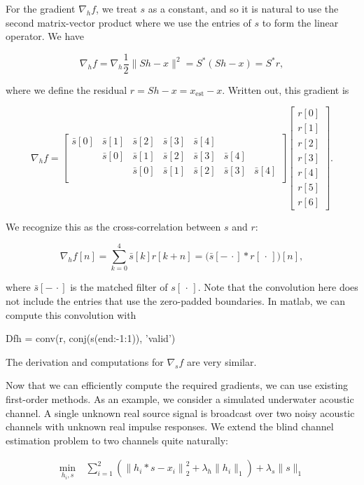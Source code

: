 \documentclass[journal]{IEEEtran}
\begin{document}
For the gradient $\nabla_hf$, we treat $s$ as a constant, and so it is natural to use the second matrix-vector product where we use the entries of $s$ to form the linear operator.  We have

\[ \nabla_hf = \nabla_h\frac{1}{2}\|Sh-x\|^2 = S^\ast(Sh-x) = S^\ast r, \] 

\noindent where we define the residual $r=Sh-x = x_\text{est}-x$.  Written out, this gradient is

\[ \nabla_h f = \begin{bmatrix} \bar{s}[0]&\bar{s}[1]&\bar{s}[2]&\bar{s}[3]&\bar{s}[4]\\&\bar{s}[0]&\bar{s}[1]&\bar{s}[2]&\bar{s}[3]&\bar{s}[4]\\&&\bar{s}[0]&\bar{s}[1]&\bar{s}[2]&\bar{s}[3]&\bar{s}[4]\\\end{bmatrix}\begin{bmatrix}r[0]\\r[1]\\r[2]\\r[3]\\r[4]\\r[5]\\r[6]\end{bmatrix}. \] 

\noindent We recognize this as the cross-correlation between $s$ and $r$:

\[ \nabla_h f[n] = \sum_{k=0}^4 \bar{s}[k]r[k+n] = \big(\bar{s}[{-\,\cdot}]\ast r[\,\cdot\,]\big)[n], \]

\noindent where $\bar{s}[{-\,\cdot}]$ is the matched filter of $s[\,\cdot\,]$.  Note that the convolution here does not include the entries that use the zero-padded boundaries.  In {\sc matlab}, we can compute this convolution with

\begin{verb}
  Dfh = conv(r, conj(s(end:-1:1)), 'valid')
\end{verb}

\noindent The derivation and computations for $\nabla_sf$ are very similar.

Now that we can efficiently compute the required gradients, we can use existing first-order methods.  As an example, we consider a simulated underwater acoustic channel.  A single unknown real source signal is broadcast over two noisy acoustic channels with unknown real impulse responses.  We extend the blind channel estimation problem to two channels quite naturally:

\begin{align*}
   \min_{h_i,s} ~&\sum_{i=1}^2\left(\left\|h_i\ast s - x_i\right\|_2^2 + \lambda_{h}\|h_i\|_1\right) + \lambda_s\|s\|_1
\end{align*}
\end{document}

